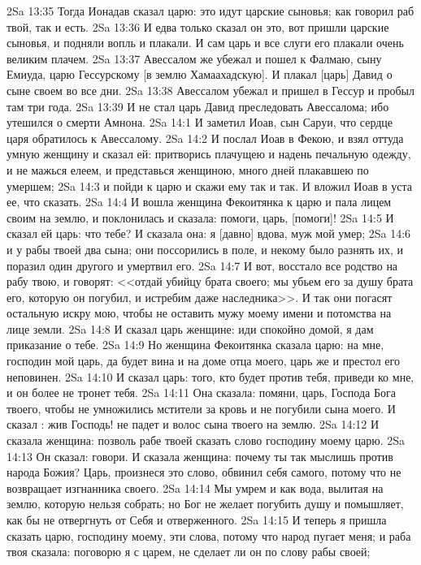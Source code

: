 \vs 2Sa 13:35 Тогда Ионадав сказал царю: это идут царские сыновья; как говорил раб твой, так и есть.
\vs 2Sa 13:36 И едва только сказал он это, вот пришли царские сыновья, и подняли вопль и плакали. И сам царь и все слуги его плакали очень великим плачем.
\vs 2Sa 13:37 Авессалом же убежал и пошел к Фалмаю, сыну Емиуда, царю Гессурскому [в землю Хамаахадскую]. И плакал [царь] Давид о сыне своем во все дни.
\vs 2Sa 13:38 Авессалом убежал и пришел в Гессур и пробыл там три года.
\vs 2Sa 13:39 И не стал царь Давид преследовать Авессалома; ибо утешился о смерти Амнона.
\vs 2Sa 14:1 И заметил Иоав, сын Саруи, что сердце царя обратилось к Авессалому.
\vs 2Sa 14:2 И послал Иоав в Фекою, и взял оттуда умную женщину и сказал ей: притворись плачущею и надень печальную одежду, и не мажься елеем, и представься женщиною, много дней плакавшею по умершем;
\vs 2Sa 14:3 и пойди к царю и скажи ему так и так. И вложил Иоав в уста ее, что сказать.
\vs 2Sa 14:4 И вошла женщина Фекоитянка к царю и пала лицем своим на землю, и поклонилась и сказала: помоги, царь, [помоги]!
\vs 2Sa 14:5 И сказал ей царь: что тебе? И сказала она: я [давно] вдова, муж мой умер;
\vs 2Sa 14:6 и у рабы твоей  два сына; они поссорились в поле, и некому было разнять их, и поразил один другого и умертвил его.
\vs 2Sa 14:7 И вот, восстало все родство на рабу твою, и говорят: <<отдай убийцу брата своего; мы убьем его за душу брата его, которую он погубил, и истребим даже наследника>>. И так они погасят остальную искру мою, чтобы не оставить мужу моему имени и потомства на лице земли.
\vs 2Sa 14:8 И сказал царь женщине: иди спокойно домой, я дам приказание о тебе.
\vs 2Sa 14:9 Но женщина Фекоитянка сказала царю: на мне, господин мой царь, да будет вина и на доме отца моего, царь же и престол его неповинен.
\vs 2Sa 14:10 И сказал царь: того, кто будет против тебя, приведи ко мне, и он более не тронет тебя.
\vs 2Sa 14:11 Она сказала: помяни, царь, Господа Бога твоего, чтобы не умножились мстители за кровь и не погубили сына моего. И сказал : жив Господь! не падет и волос сына твоего на землю.
\vs 2Sa 14:12 И сказала женщина: позволь рабе твоей сказать  слово господину моему царю.
\vs 2Sa 14:13 Он сказал: говори. И сказала женщина: почему ты так мыслишь против народа Божия? Царь, произнеся это слово, обвинил себя самого, потому что не возвращает изгнанника своего.
\vs 2Sa 14:14 Мы умрем и  как вода, вылитая на землю, которую нельзя собрать; но Бог не желает погубить душу и помышляет, как бы не отвергнуть от Себя и отверженного.
\vs 2Sa 14:15 И теперь я пришла сказать царю, господину моему, эти слова, потому что народ пугает меня; и раба твоя сказала: поговорю я с царем, не сделает ли он по слову рабы своей;
